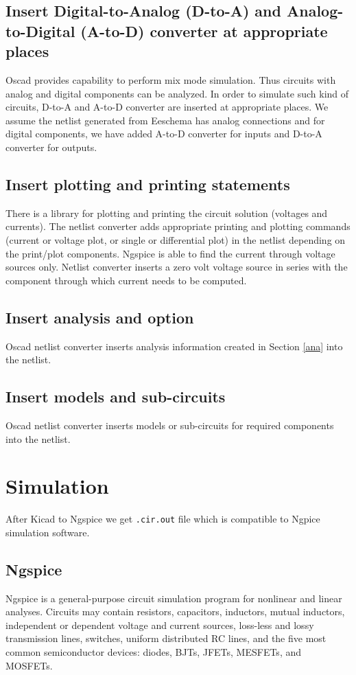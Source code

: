\subsection{Insert Digital-to-Analog (D-to-A) and Analog-to-Digital (A-to-D) converter at appropriate places}
Oscad provides capability to perform mix mode simulation. Thus circuits with analog and digital components can be analyzed. In order to simulate such kind of circuits, D-to-A and A-to-D converter are inserted at appropriate places. We assume the netlist generated from Eeschema has analog connections and for digital components, we have added A-to-D converter for inputs and D-to-A converter for outputs.
\subsection{Insert plotting and printing statements}
There is a library for plotting and printing the circuit solution (voltages and currents). The netlist converter adds appropriate printing and plotting commands (current or voltage plot, or single or differential plot) in the netlist depending on the print/plot components. Ngspice is able to find the current through voltage sources only. Netlist converter inserts a zero volt voltage source in series with the component through which current needs to be computed. 
\subsection{Insert analysis and option}
Oscad netlist converter inserts analysis information created in Section \ref{ana} into the netlist.
\subsection{Insert models and sub-circuits}
Oscad netlist converter inserts models or sub-circuits for required components into the netlist. 
\section{Simulation}
After Kicad to Ngspice we get {\tt .cir.out} file which is compatible to Ngpice simulation software.
\subsection{Ngspice}
Ngspice is a general-purpose circuit simulation program for nonlinear and linear analyses. Circuits may contain resistors, capacitors, inductors, mutual inductors, independent or dependent voltage and current sources, loss-less and lossy transmission lines, switches, uniform distributed RC lines, and the five most common semiconductor devices: diodes, BJTs, JFETs, MESFETs, and MOSFETs. 

